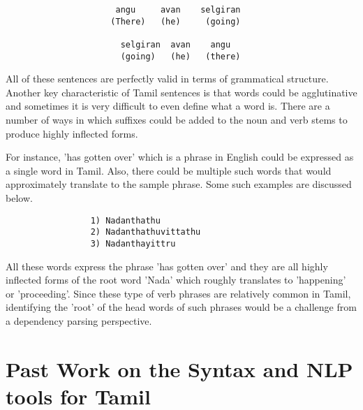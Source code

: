 \documentclass[11pt,letterpaper]{article}
\begin{document}
\begin{verbatim}
                      angu     avan    selgiran 
                     (There)   (he)     (going)

                       selgiran  avan    angu
                       (going)   (he)   (there)
\end{verbatim}
All of these sentences are perfectly valid in terms of grammatical structure. 
Another key characteristic of Tamil sentences is that words could be agglutinative and sometimes it is very difficult to even define what a word is. 
There are a number of ways in which suffixes could be added to the noun and verb stems to produce highly inflected forms.

For instance, 'has gotten over' which is a phrase in English could be
expressed as a single word in Tamil. Also, there could be multiple such words that would approximately translate to the sample
phrase. Some such examples are discussed below.

\begin{verbatim}
                 1) Nadanthathu
                 2) Nadanthathuvittathu
                 3) Nadanthayittru
\end{verbatim}

All these words express the phrase 'has gotten over' and they are all highly inflected
forms of the root word 'Nada' which roughly translates to 'happening' or 'proceeding'.
Since these type of verb phrases are relatively common in Tamil, identifying the 'root' of the head
words of such phrases would be a challenge from a dependency parsing perspective.

\section{Past Work on the Syntax and NLP tools for Tamil}
\end{document}
